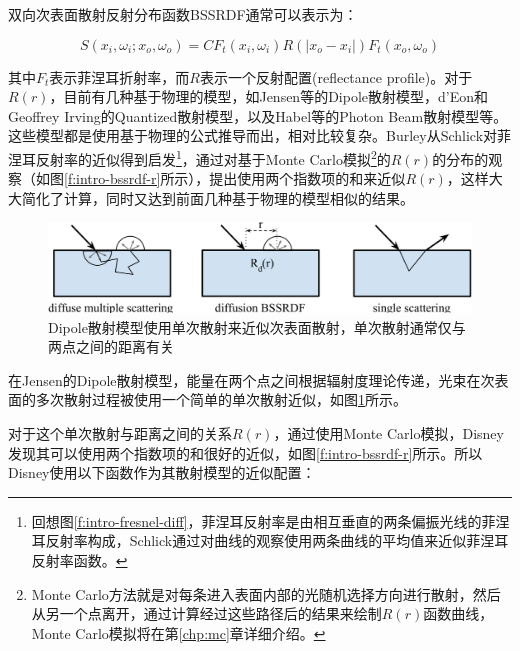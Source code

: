 \noindent 双向次表面散射反射分布函数BSSRDF通常可以表示为：

\begin{equation}
	S(x_i,\omega_i;x_o,\omega_o)=CF_t(x_i,\omega_i)R(|x_o-x_i|)F_t(x_o,\omega_o)
\end{equation}

\noindent 其中$F_t$表示菲涅耳折射率，而$R$表示一个反射配置(reflectance profile)。对于$R(r)$，目前有几种基于物理的模型，如Jensen等\cite{a:Apracticalmodelforsubsurfacelighttransport}的Dipole散射模型，d’Eon和Geoffrey Irving\cite{a:AQuantizedDiffusionModelforRenderingTranslucentMaterials}的Quantized散射模型，以及Habel等\cite{a:PhotonBeamDiffusion:AHybridMonteCarloMethodforSubsurfaceScattering}的Photon Beam散射模型等。这些模型都是使用基于物理的公式推导而出，相对比较复杂。Burley从Schlick对菲涅耳反射率的近似得到启发\footnote{回想图\ref{f:intro-fresnel-diff}，菲涅耳反射率是由相互垂直的两条偏振光线的菲涅耳反射率构成，Schlick通过对曲线的观察使用两条曲线的平均值来近似菲涅耳反射率函数。}，通过对基于Monte Carlo模拟\footnote{Monte Carlo方法就是对每条进入表面内部的光随机选择方向进行散射，然后从另一个点离开，通过计算经过这些路径后的结果来绘制$R(r)$函数曲线，Monte Carlo模拟将在第\ref{chp:mc}章详细介绍。}的$R(r)$的分布的观察（如图\ref{f:intro-bssrdf-r}所示），提出使用两个指数项的和来近似$R(r)$，这样大大简化了计算，同时又达到前面几种基于物理的模型相似的结果。

\begin{figure}
	\includegraphics[width=\textwidth]{figures/intro/bssrdf}
	\caption{Dipole散射模型使用单次散射来近似次表面散射，单次散射通常仅与两点之间的距离有关}
	\label{f:intro-bssrdf}
\end{figure}

在Jensen的Dipole散射模型，能量在两个点之间根据辐射度理论传递，光束在次表面的多次散射过程被使用一个简单的单次散射近似，如图\ref{f:intro-bssrdf}所示。

对于这个单次散射与距离之间的关系$R(r)$，通过使用Monte Carlo模拟，Disney发现其可以使用两个指数项的和很好的近似，如图\ref{f:intro-bssrdf-r}所示。所以Disney使用以下函数作为其散射模型的近似配置：

